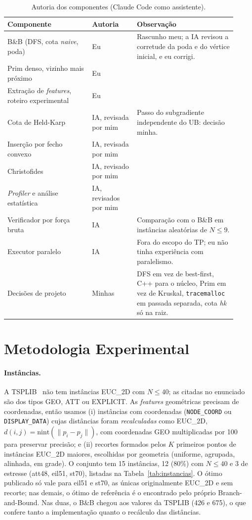 \documentclass[12pt]{article}
\begin{document}
\begin{table}[ht]
\centering
\caption{Autoria dos componentes (Claude Code como assistente).}
\label{tab:autoria}
\small
\begin{tabular}{p{0.34\linewidth}p{0.18\linewidth}p{0.4\linewidth}}
\toprule
Componente & Autoria & Observação \\
\midrule
B\&B (DFS, cota \textit{naive}, poda) & Eu & Rascunho meu; a IA revisou a corretude da poda e do vértice inicial, e eu corrigi. \\
Prim denso, vizinho mais próximo & Eu & \\
Extração de \textit{features}, roteiro experimental & Eu & \\
Cota de Held-Karp & IA, revisada por mim & Passo do subgradiente independente do UB: decisão minha. \\
Inserção por fecho convexo & IA, revisada por mim & \\
Christofides & IA, revisado por mim & \\
\textit{Profiler} e análise estatística & IA, revisados por mim & \\
Verificador por força bruta & IA & Comparação com o B\&B em instâncias aleatórias de $N \le 9$. \\
Executor paralelo & IA & Fora do escopo do TP; eu não tinha experiência com paralelismo. \\
Decisões de projeto & Minhas & DFS em vez de best-first, C++ para o núcleo, Prim em vez de Kruskal, \texttt{tracemalloc} em passada separada, cota \textit{hk} só na raiz. \\
\bottomrule
\end{tabular}
\end{table}

\section{Metodologia Experimental}\label{sec:metodo}

\paragraph{Instâncias.} A TSPLIB~\cite{reinelt1991} não tem instâncias EUC\_2D com
$N \le 40$; as citadas no enunciado são dos tipos GEO, ATT ou EXPLICIT. As
\textit{features} geométricas precisam de coordenadas, então usamos (i) instâncias com coordenadas
(\texttt{NODE\_COORD} ou \texttt{DISPLAY\_DATA}) cujas distâncias foram
\emph{recalculadas} como EUC\_2D, $d(i,j) = \text{nint}(\lVert p_i - p_j \rVert)$, com
coordenadas GEO multiplicadas por 100 para preservar precisão; e (ii) recortes formados
pelos $K$ primeiros pontos de instâncias EUC\_2D maiores, escolhidas por geometria
(uniforme, agrupada, alinhada, em grade). O conjunto tem 15 instâncias, 12 (80\%) com
$N \le 40$ e 3 de estresse (att48, eil51, st70), listadas na Tabela~\ref{tab:instancias}.
O ótimo publicado só vale para eil51 e st70, as únicas originalmente EUC\_2D e sem
recorte; nas demais, o ótimo de referência é o encontrado pelo próprio Branch-and-Bound.
Nas duas, o B\&B chegou aos valores da TSPLIB (426 e 675), o que confere tanto a
implementação quanto o recálculo das distâncias.
\end{document}
